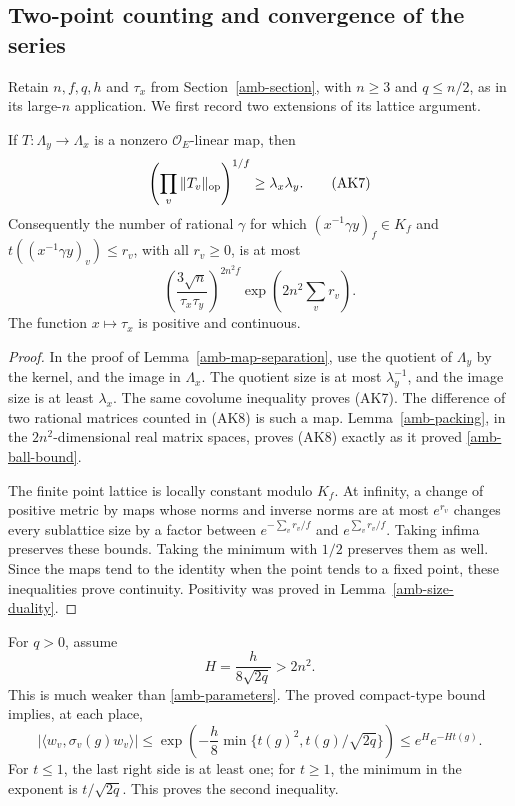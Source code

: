 \subsection{Two-point counting and convergence of the series}

Retain \(n,f,q,h\) and \(\tau_x\) from
Section~\ref{amb-section}, with \(n\ge3\) and \(q\le n/2\),
as in its large-\(n\) application.  We first record two extensions
of its lattice argument.

\begin{lemma}\label{ak-count}
If \(T:\Lambda_y\to\Lambda_x\) is a nonzero
\(\mathcal O_E\)-linear map, then
\[
              \left(\prod_v\|T_v\|_{\rm op}\right)^{1/f}
                                      \ge\lambda_x\lambda_y.
 \tag{AK7}
\]
Consequently the number of rational \(\gamma\) for which
\((x^{-1}\gamma y)_f\in K_f\) and
\(t((x^{-1}\gamma y)_v)\le r_v\), with all \(r_v\ge0\),
is at most
\[
 \left(\frac{3\sqrt n}{\tau_x\tau_y}\right)^{2n^2f}
                               \exp\left(2n^2\sum_v r_v\right).
 \tag{AK8}
\]
The function \(x\mapsto\tau_x\) is positive and continuous.
\end{lemma}
\begin{proof}
In the proof of Lemma~\ref{amb-map-separation}, use
the quotient of \(\Lambda_y\) by the kernel, and the
image in \(\Lambda_x\).  The quotient size is at most
\(\lambda_y^{-1}\), and the image size is at least
\(\lambda_x\).  The same covolume inequality proves (AK7).
The difference of two rational matrices counted in (AK8)
is such a map.  Lemma~\ref{amb-packing}, in the
\(2n^2\)-dimensional real matrix spaces, proves (AK8)
exactly as it proved \eqref{amb-ball-bound}.

The finite point lattice is locally constant modulo \(K_f\).
At infinity, a change of positive metric by maps whose
norms and inverse norms are at most \(e^{r_v}\)
changes every sublattice size by a factor between
\(e^{-\sum_vr_v/f}\) and \(e^{\sum_vr_v/f}\).
Taking infima preserves these bounds.  Taking the minimum
with \(1/2\) preserves them as well.  Since the maps tend
to the identity when the point tends to a fixed point,
these inequalities prove continuity.  Positivity was proved
in Lemma~\ref{amb-size-duality}.
\end{proof}

For \(q>0\), assume
\[
                         H=\frac{h}{8\sqrt{2q}}>2n^2.
 \tag{AK9}
\]
This is much weaker than \eqref{amb-parameters}.
The proved compact-type bound implies, at each place,
\[
 \bigl|\langle w_v,\sigma_v(g)w_v\rangle\bigr|
 \le \exp\!\left(-\frac h8
                \min\{t(g)^2,t(g)/\sqrt{2q}\}\right)
                         \le e^H e^{-Ht(g)}.
 \tag{AK10}
\]
For \(t\le1\), the last right side is at least one;
for \(t\ge1\), the minimum in the exponent is
\(t/\sqrt{2q}\).  This proves the second inequality.

